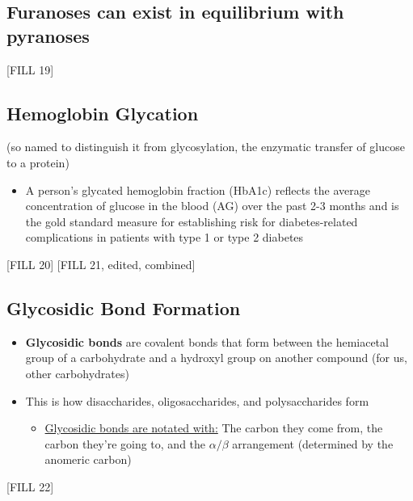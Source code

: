 \documentclass[10pt]{article}
\begin{document}
\subsection*{Furanoses can exist in equilibrium with pyranoses}
\begin{center}
    [FILL 19]
\end{center}

\subsection*{Hemoglobin Glycation}
(so named to distinguish it from glycosylation, the enzymatic transfer of glucose to a protein)

\begin{itemize}
    \item A person's glycated hemoglobin fraction (HbA1c) reflects the average concentration of glucose in the blood (AG) over the past 2-3 months and is the gold standard measure for establishing risk for diabetes-related complications in patients with type 1 or type 2 diabetes
\end{itemize}
\begin{center}
    [FILL 20]
    [FILL 21, edited, combined]
\end{center}

\subsection*{Glycosidic Bond Formation}
\begin{itemize}
    \item \textbf{Glycosidic bonds} are covalent bonds that form between the hemiacetal group of a carbohydrate and a hydroxyl group on another compound (for us, other carbohydrates)
    \item This is how disaccharides, oligosaccharides, and polysaccharides form
    \begin{itemize}
        \item \underline{Glycosidic bonds are notated with:} The carbon they come from, the carbon they're going to, and the $\alpha/\beta$ arrangement (determined by the anomeric carbon)
    \end{itemize}
\end{itemize}
\begin{center}
    [FILL 22]
\end{center}
\end{document}
